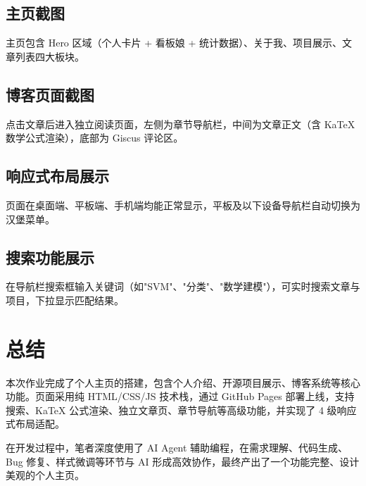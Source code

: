 \documentclass[12pt, a4paper]{article}
\begin{document}
\subsection{主页截图}

主页包含 Hero 区域（个人卡片 + 看板娘 + 统计数据）、关于我、项目展示、文章列表四大板块。

\subsection{博客页面截图}

点击文章后进入独立阅读页面，左侧为章节导航栏，中间为文章正文（含 KaTeX 数学公式渲染），底部为 Giscus 评论区。

\subsection{响应式布局展示}

页面在桌面端、平板端、手机端均能正常显示，平板及以下设备导航栏自动切换为汉堡菜单。

\subsection{搜索功能展示}

在导航栏搜索框输入关键词（如"SVM"、"分类"、"数学建模"），可实时搜索文章与项目，下拉显示匹配结果。

\section{总结}

本次作业完成了个人主页的搭建，包含个人介绍、开源项目展示、博客系统等核心功能。页面采用纯 HTML/CSS/JS 技术栈，通过 GitHub Pages 部署上线，支持搜索、KaTeX 公式渲染、独立文章页、章节导航等高级功能，并实现了 4 级响应式布局适配。

在开发过程中，笔者深度使用了 AI Agent 辅助编程，在需求理解、代码生成、Bug 修复、样式微调等环节与 AI 形成高效协作，最终产出了一个功能完整、设计美观的个人主页。
\end{document}
